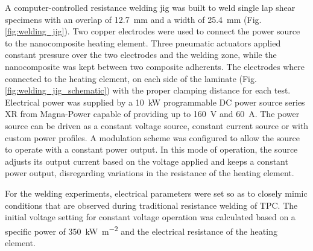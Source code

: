 \documentclass[11pt,review,times]{elsarticle}
\begin{document}
A computer-controlled resistance welding jig was built to weld single lap shear specimens with an overlap of \SI{12.7}{\milli\metre} and a width of \SI{25.4}{\milli\metre} (Fig. \ref{fig:welding_jig}). 
Two copper electrodes were used to connect the power source to the nanocomposite heating element. 
Three pneumatic actuators applied constant pressure over the two electrodes and the welding zone, while the nanocomposite was kept between two composite adherents. 
The electrodes where connected to the heating element, on each side of the laminate (Fig. \ref{fig:welding_jig_schematic}) with the proper clamping distance for each test. 
Electrical power was supplied by a \SI{10}{\kW} programmable DC power source series XR from Magna-Power capable of providing up to \SI{160}{\volt} and \SI{60}{\ampere}. 
The power source can be driven as a constant voltage source, constant current source or with custom power profiles. 
A modulation scheme was configured to allow the source to operate with a constant power output. 
In this mode of operation, the source adjusts its output current based on the voltage applied and keeps a constant power output, disregarding variations in the resistance of the heating element. 

For the welding experiments, electrical parameters were set so as to closely mimic conditions that are observed during traditional resistance welding of TPC. 
The initial voltage setting for constant voltage operation was calculated based on a specific power of \SI{350}{\kW\per\square\metre} and the electrical resistance of the heating element. 
\end{document}
